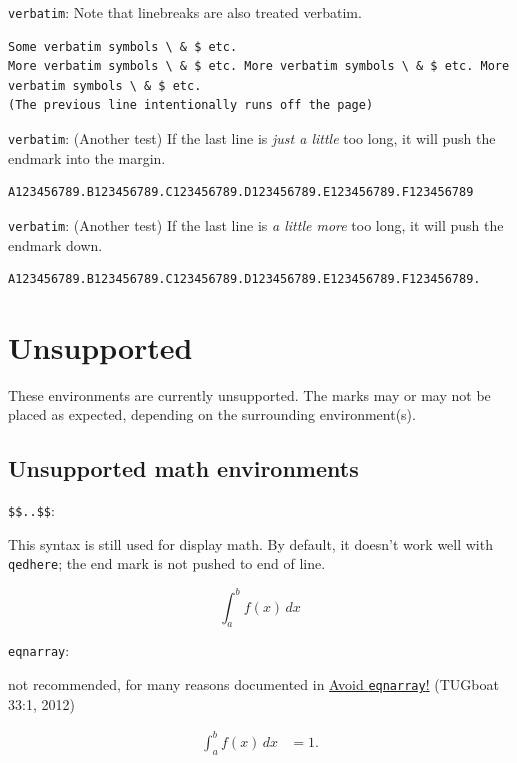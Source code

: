 \documentclass[leqno]{article}
\newcommand{\testtype}[2]{\texttt{#1}:%
  #2}
\newcommand{\makeoutertest}[3]{
  \begin{test}
    \testtype{#1}{#2}
    #3
  \end{test}
}
\newcommand{\maketest}[3]{
  \makeoutertest{#1}{#2}{
    \begin{#1}
      #3
    \end{#1}
  }
}
\begin{document}
\begin{test} %
  \texttt{verbatim}:
  Note that linebreaks are also treated verbatim.
\begin{verbatim}
Some verbatim symbols \ & $ etc.
More verbatim symbols \ & $ etc. More verbatim symbols \ & $ etc. More verbatim symbols \ & $ etc.
(The previous line intentionally runs off the page) \end{verbatim}
\end{test}

\begin{test} %
  \texttt{verbatim}:
  (Another test)
  If the last line is \emph{just a little} too long, it will push the endmark into the margin.
\begin{verbatim}
A123456789.B123456789.C123456789.D123456789.E123456789.F123456789 \end{verbatim}
\end{test}
\begin{test} %
  \texttt{verbatim}:
  (Another test)
  If the last line is \emph{a little more} too long, it will push the endmark down.
\begin{verbatim}
A123456789.B123456789.C123456789.D123456789.E123456789.F123456789. \end{verbatim}
\end{test}



\section{Unsupported}

These environments are currently unsupported.
The marks may or may not be placed as expected, depending on the surrounding environment(s).

\subsection{Unsupported math environments}



\makeoutertest{\$\$..\$\$}{
  This syntax is still used for display math.
  By default, it doesn't work well with \texttt{qedhere}; the end mark is not pushed to end of line.
}{
  $$ 
    \int_a^b f(x)\, dx
  $$
}


\maketest{eqnarray}{
  not recommended, for many reasons documented in
  \href{https://tug.org/TUGboat/tb33-1/tb103madsen.pdf}{Avoid \texttt{eqnarray}!} (TUGboat 33:1, 2012)
}{
  \int_a^b f(x)\, dx & = 1.
}
\end{document}
